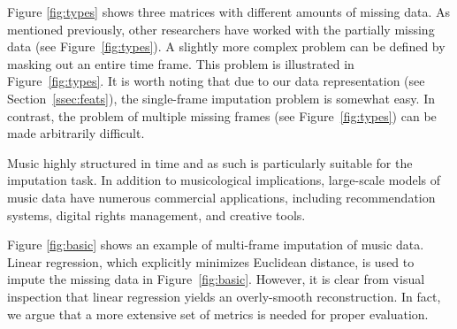 \documentclass{article}
\begin{document}

Figure \ref{fig:types} shows three matrices with different amounts of
missing data.  As mentioned previously, other researchers
\cite{Smaragdis2009} have worked with the partially missing data (see
Figure~\ref{fig:types}).  A slightly more complex problem can be
defined by masking out an entire time frame.  This problem is
illustrated in Figure~\ref{fig:types}.  It is worth noting that due to
our data representation (see Section~\ref{ssec:feats}), the
single-frame imputation problem is somewhat easy.  In contrast, the
problem of multiple missing frames (see Figure~\ref{fig:types}) can be
made arbitrarily difficult.

Music highly structured in time and as such is particularly suitable
for the imputation task.  In addition to musicological implications,
large-scale models of music data have numerous commercial
applications, including recommendation systems, digital rights
management, and creative tools.  

Figure \ref{fig:basic} shows an example of multi-frame imputation of
music data.  Linear regression, which explicitly minimizes Euclidean
distance, is used to impute the missing data in
Figure~\ref{fig:basic}.  However, it is clear from visual inspection
that linear regression yields an overly-smooth reconstruction.  In
fact, we argue that a more extensive set of metrics is needed for
proper evaluation.
\end{document}
